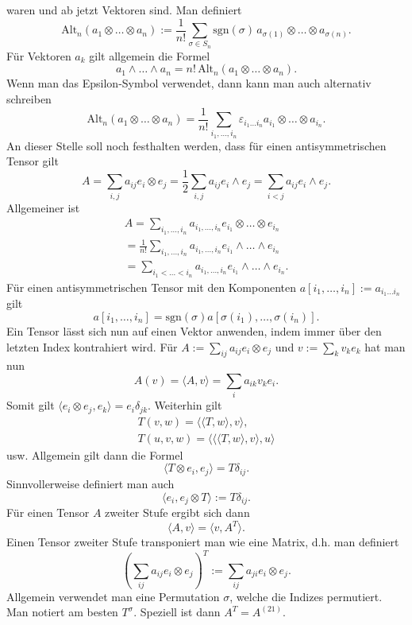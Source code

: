 \documentclass[a4paper,10pt,fleqn,twocolumn,twoside]{article}
\begin{document}
waren und ab jetzt Vektoren sind.
Man definiert
\[\mathrm{Alt}_n(a_1\otimes\ldots\otimes a_n)
:= \frac{1}{n!}\sum_{\sigma\in S_n}\mathrm{sgn}(\sigma)\,
a_{\sigma(1)}\otimes\ldots\otimes a_{\sigma(n)}.\]
Für Vektoren \(a_k\) gilt allgemein die Formel
\[a_1\wedge\ldots\wedge a_n
= n!\,\mathrm{Alt}_n(a_1\otimes\ldots\otimes a_n).\]
Wenn man das Epsilon-Symbol verwendet, dann kann man auch alternativ
schreiben
\[\mathrm{Alt}_n (a_1\otimes\ldots\otimes a_n)
= \frac{1}{n!} \sum_{i_1,\ldots,i_n} \varepsilon_{i_1\ldots i_n}
a_{i_1}\otimes\ldots\otimes a_{i_n}.\]
An dieser Stelle soll noch festhalten werden,
dass für einen antisymmetrischen Tensor
gilt
\[A = \sum_{i,j}a_{ij}e_i\otimes e_j
= \frac{1}{2}\sum_{i,j}a_{ij} e_i\wedge e_j
= \sum_{i<j}a_{ij}e_i\wedge e_j.\]
Allgemeiner ist
\begin{gather*}
A = \sum_{i_1,\ldots,i_n}\!\! a_{i_1,\ldots,i_n}
e_{i_1}\!\otimes\ldots\otimes e_{i_n}\\
= \frac{1}{n!} \sum_{i_1,\ldots,i_n}\!\! a_{i_1,\ldots,i_n}
e_{i_1}\!\wedge\ldots\wedge e_{i_n}\\
= \sum_{i_1<\ldots<i_n}\!\! a_{i_1,\ldots,i_n}
e_{i_1}\!\wedge\ldots\wedge e_{i_n}.
\end{gather*}
Für einen antisymmetrischen Tensor mit den Komponenten
\(a[i_1,\ldots,i_n]:=a_{i_1\ldots i_n}\) gilt
\[a[i_1,\ldots,i_n]=\mathrm{sgn}(\sigma)
a[\sigma(i_1),\ldots,\sigma(i_n)].\]
%
Ein Tensor lässt sich nun auf einen Vektor anwenden, indem immer
über den letzten Index kontrahiert wird. Für
\(A:=\sum_{ij} a_{ij}e_i\otimes e_j\) und \(v:=\sum_k v_ke_k\)
hat man nun
\[A(v) = \langle A,v\rangle = \sum_i a_{ik}v_k e_i.\]
Somit gilt
\(\langle e_i\otimes e_j, e_k\rangle = e_i\delta_{jk}\).
Weiterhin gilt
\begin{gather*}
T(v,w) = \langle\langle T,w\rangle, v\rangle,\\
T(u,v,w) = \langle\langle\langle T,w\rangle,v\rangle,u\rangle
\end{gather*}
usw. Allgemein gilt dann die Formel
\[\langle T\otimes e_i,e_j\rangle = T\delta_{ij}.\]
Sinnvollerweise definiert man auch
\[\langle e_i,e_j\otimes T\rangle := T\delta_{ij}.\]
Für einen Tensor \(A\) zweiter Stufe ergibt sich dann
\[\langle A,v\rangle = \langle v,A^T\rangle.\]
Einen Tensor zweiter Stufe transponiert man wie eine Matrix, d.h. man definiert
\[(\sum_{ij}a_{ij}e_i\otimes e_j)^T:=\sum_{ij} a_{ji}e_i\otimes e_j.\]
Allgemein verwendet man eine Permutation \(\sigma\), welche die
Indizes permutiert. Man notiert am besten \(T^\sigma\). Speziell
ist dann \(A^T=A^{(21)}\).
\end{document}
